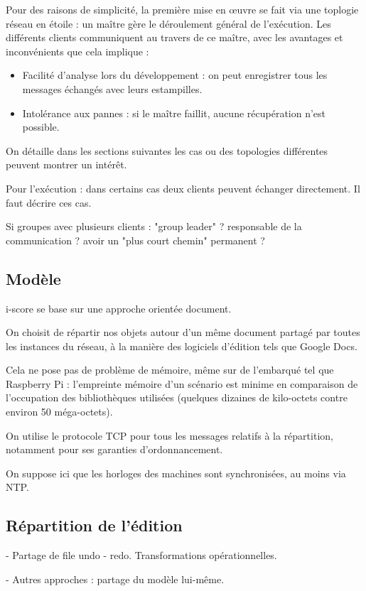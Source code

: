 \documentclass{article}
\begin{document}
Pour des raisons de simplicité, la première mise en œuvre se fait via une toplogie réseau en étoile : un maître gère 
le déroulement général de l'exécution. 
Les différents clients communiquent au travers de ce maître, avec les avantages et inconvénients que cela implique : 
\begin{itemize}
	\item Facilité d'analyse lors du développement : on peut enregistrer tous les messages échangés avec leurs estampilles.
	\item Intolérance aux pannes : si le maître faillit, aucune récupération n'est possible.
\end{itemize}

On détaille dans les sections suivantes les cas ou des topologies différentes peuvent montrer un intérêt.

Pour l'exécution : dans certains cas deux clients peuvent échanger directement.
Il faut décrire ces cas.

Si groupes avec plusieurs clients : "group leader" ? responsable de la communication ? avoir un "plus court chemin" permanent ?

\subsection{Modèle}
i-score se base sur une approche orientée document.

On choisit de répartir nos objets autour d'un même document partagé par toutes les instances du réseau, 
à la manière des logiciels d'édition tels que Google Docs. %

Cela ne pose pas de problème de mémoire, même sur de l'embarqué tel que Raspberry Pi : l'empreinte mémoire d'un scénario est minime en comparaison de l'occupation des bibliothèques utilisées (quelques dizaines de kilo-octets contre environ 50 méga-octets).

On utilise le protocole TCP pour tous les messages relatifs à la répartition, notamment pour ses garanties d'ordonnancement.

On suppose ici que les horloges des machines sont synchronisées, au moins via NTP.
\subsection{Répartition de l'édition}
- Partage de file undo - redo. Transformations opérationnelles. %

- Autres approches : partage du modèle lui-même.
\end{document}
